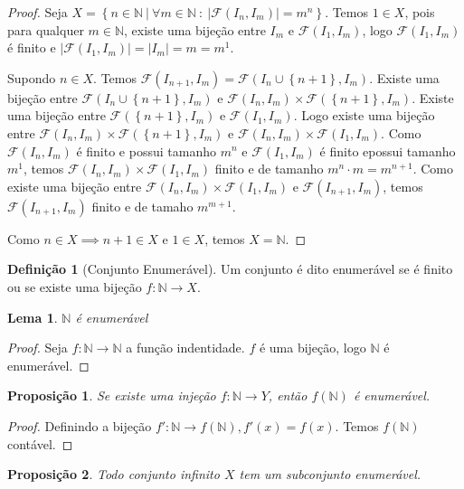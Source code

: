 \documentclass{article}
\theoremstyle{plain}
\newtheorem{prop}{Proposição}[section]
\newtheorem{lema}{Lema}
\theoremstyle{definition}
\newtheorem{definicao}{Definição}[section]
\theoremstyle{remark}
\begin{document}
\begin{proof}
	Seja $X = \left\{ n \in \mathbb{N} \: | \: \forall m\in \mathbb{N} \: : \: |\mathcal{F}(I_n, I_m) | = m^n \right\}$.  Temos $1\in X$, pois para qualquer $m\in \mathbb{N}$, existe uma bijeção entre $I_m$ e $\mathcal{F}(I_1, I_m)$, logo $\mathcal{F}(I_1, I_m)$ é finito e  $|\mathcal{F}(I_1, I_m)| = |I_m| = m =  m^1$. 

	Supondo $n\in X$. Temos $\mathcal{F}(I_{n+1}, I_{m} ) = \mathcal{F}(I_n\cup\left\{n+1\right\}, I_m)$. Existe uma bijeção entre $\mathcal{F}(I_n\cup\left\{n+1\right\}, I_m)$ e $\mathcal{F}(I_n, I_m) \times \mathcal{F}(\left\{n+1\right\}, I_m)$. Existe uma bijeção entre  $\mathcal{F}(\left\{n+1\right\}, I_m)$ e  $\mathcal{F}(I_1, I_m)$. Logo  existe uma bijeção entre $\mathcal{F}(I_n, I_m) \times \mathcal{F}(\left\{n+1\right\}, I_m)$ e $\mathcal{F}(I_n, I_m) \times \mathcal{F}(I_1, I_m)$.  Como $\mathcal{F}(I_n, I_m) $ é finito e possui tamanho $m^n$ e $ \mathcal{F}(I_1, I_m)$ é finito epossui tamanho $m^1$, temos $\mathcal{F}(I_n, I_m) \times \mathcal{F}(I_1, I_m)$ finito e de tamanho $m^n\cdot m = m^{n+1}$. Como existe uma bijeção entre $\mathcal{F}(I_n, I_m) \times \mathcal{F}(I_1, I_m)$ e  $\mathcal{F}(I_{n+1}, I_{m} ) $, temos $\mathcal{F}(I_{n+1}, I_{m} ) $ finito e de tamaho $m^{m+1}$.

	Como $n\in X \implies n+1\in X$ e $1\in X$, temos $X = \mathbb{N}$.
\end{proof}
\begin{definicao}[Conjunto Enumerável]
	Um conjunto é dito enumerável se é finito ou se existe uma bijeção $f: \mathbb{N} \to X$.
\end{definicao}
\begin{lema}
	$\mathbb{N}$ é enumerável
\end{lema}
\begin{proof}
	Seja $f: \mathbb{N} \to \mathbb{N}$ a função indentidade. $f$ é uma bijeção, logo $\mathbb{N}$ é enumerável.
\end{proof}
\begin{prop}
	Se existe uma injeção $f: \mathbb{N} \to Y$, então $f(\mathbb{N})$ é enumerável. 
\end{prop}
\begin{proof}
	Definindo a bijeção $f' : \mathbb{N} \to f( \mathbb{N}), f'(x) = f(x)$. Temos $f(\mathbb{N})$ contável.
\end{proof}
\begin{prop}
	Todo conjunto infinito $X$ tem um subconjunto enumerável.
\end{prop}
\end{document}
